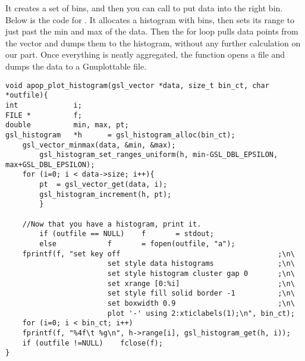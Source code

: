 It creates a set of bins, and
then you can call  to put
data into the right bin. Below is the code for . 
It allocates a histogram with
 bins, then sets its range to just past the min and max
of the data. Then the for loop pulls data points from the vector and
dumps them to the histogram, without any further calculation on our part.
Once everything is neatly aggregated, the function opens a file and dumps the data to a Gnuplottable file.
\begin{lstlisting}
void apop_plot_histogram(gsl_vector *data, size_t bin_ct, char *outfile){
int             i;
FILE *          f;
double          min, max, pt;
gsl_histogram   *h      = gsl_histogram_alloc(bin_ct);
    gsl_vector_minmax(data, &min, &max);
        gsl_histogram_set_ranges_uniform(h, min-GSL_DBL_EPSILON, max+GSL_DBL_EPSILON);
    for (i=0; i < data->size; i++){
        pt  = gsl_vector_get(data, i);
        gsl_histogram_increment(h, pt);
        }

    //Now that you have a histogram, print it.
        if (outfile == NULL)    f       = stdout;
        else            f       = fopen(outfile, "a");
    fprintf(f, "set key off                                     ;\n\
                        set style data histograms               ;\n\
                        set style histogram cluster gap 0       ;\n\
                        set xrange [0:%i]                       ;\n\
                        set style fill solid border -1          ;\n\
                        set boxwidth 0.9                        ;\n\
                        plot '-' using 2:xticlabels(1);\n", bin_ct);
    for (i=0; i < bin_ct; i++)
    fprintf(f, "%4f\t %g\n", h->range[i], gsl_histogram_get(h, i));
    if (outfile !=NULL)    fclose(f);
}
\end{lstlisting}
\index{Gnuplot|)}
